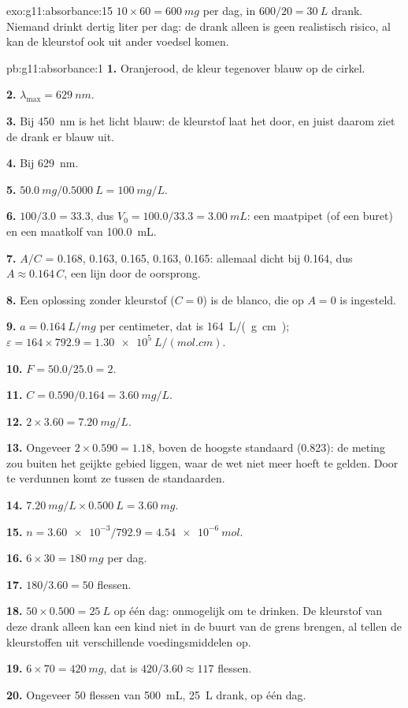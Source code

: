 \begin{solution}{exo:g11:absorbance:15}
$10 \times 60 = \qty{600}{mg}$ per dag, in $600 / 20 = \qty{30}{L}$
drank. Niemand drinkt dertig liter per dag: de drank alleen is geen
realistisch risico, al kan de kleurstof ook uit ander voedsel komen.
\end{solution}

\begin{solution}{pb:g11:absorbance:1}
\textbf{1.} Oranjerood, de kleur tegenover blauw op de cirkel.

\textbf{2.} $\lambda_{\max} = \qty{629}{nm}$.

\textbf{3.} Bij \qty{450}{nm} is het licht blauw: de kleurstof laat het
door, en juist daarom ziet de drank er blauw uit.

\textbf{4.} Bij \qty{629}{nm}.

\textbf{5.} $\qty{50.0}{mg} / \qty{0.5000}{L} = \qty{100}{mg/L}$.

\textbf{6.}  $100 / 3.0 = 33.3$, dus
$V_0 = 100.0 / 33.3 = \qty{3.00}{mL}$: een maatpipet (of een buret) en
een maatkolf van \qty{100.0}{mL}.

\textbf{7.} $A/C$ = 0.168, 0.163, 0.165, 0.163, 0.165: allemaal dicht bij
0.164, dus $A \approx 0.164\, C$, een lijn door de oorsprong.

\textbf{8.} Een oplossing zonder kleurstof ($C = 0$) is de blanco, die op
$A = 0$ is ingesteld.

\textbf{9.} $a = \qty{0.164}{L/mg}$ per centimeter, dat is
\qty{164}{L/(g.cm)}; $\varepsilon = 164 \times 792.9 =
\qty{1.30e5}{L/(mol.cm)}$.

\textbf{10.} $F = 50.0 / 25.0 = 2$.

\textbf{11.} $C = 0.590 / 0.164 = \qty{3.60}{mg/L}$.

\textbf{12.} $2 \times 3.60 = \qty{7.20}{mg/L}$.

\textbf{13.} Ongeveer $2 \times 0.590 = 1.18$, boven de hoogste
standaard (0.823): de meting zou buiten het geijkte gebied liggen, waar
de wet niet meer hoeft te gelden. Door te verdunnen komt ze tussen de
standaarden.

\textbf{14.} $\qty{7.20}{mg/L} \times \qty{0.500}{L} = \qty{3.60}{mg}$.

\textbf{15.} $n = \num{3.60e-3} / 792.9 = \qty{4.54e-6}{mol}$.

\textbf{16.} $6 \times 30 = \qty{180}{mg}$ per dag.

\textbf{17.} $180 / 3.60 = 50$ flessen.

\textbf{18.} $50 \times 0.500 = \qty{25}{L}$ op één dag: onmogelijk om te
drinken. De kleurstof van deze drank alleen kan een kind niet in de buurt
van de grens brengen, al tellen de kleurstoffen uit verschillende
voedingsmiddelen op.

\textbf{19.} $6 \times 70 = \qty{420}{mg}$, dat is $420 / 3.60 \approx
117$ flessen.

\textbf{20.} Ongeveer 50 flessen van \qty{500}{mL}, \qty{25}{L} drank, op
één dag.
\end{solution}
